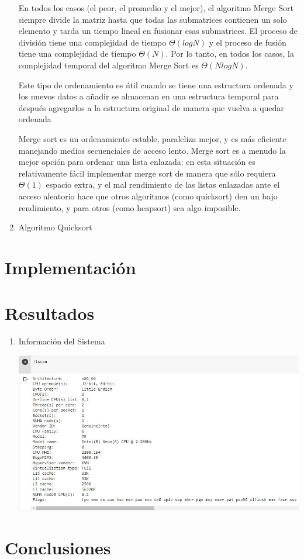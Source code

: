 \documentclass{article}
\begin{document}
\begin{enumerate}
        En todos los casos (el peor, el promedio y el mejor), el algoritmo Merge Sort siempre divide la matriz hasta que todas las submatrices contienen un solo elemento y tarda un tiempo lineal en fusionar esas submatrices. El proceso de división tiene una complejidad de tiempo $\Theta (logN)$ y el proceso de fusión tiene una complejidad de tiempo $\Theta (N)$. Por lo tanto, en todos los casos, la complejidad temporal del algoritmo Merge Sort es $\Theta(NlogN)$.

        Este tipo de ordenamiento es útil cuando se tiene una estructura ordenada y los nuevos datos a añadir se almacenan en una estructura temporal para después agregarlos a la estructura original de manera que vuelva a quedar ordenada
        
Merge sort es un ordenamiento estable, paraleliza mejor, y es más eficiente manejando medios secuenciales de acceso lento. Merge sort es a menudo la mejor opción para ordenar una lista enlazada: en esta situación es relativamente fácil implementar merge sort de manera que sólo requiera $\Theta (1)$ espacio extra, y el mal rendimiento de las listas enlazadas ante el acceso aleatorio hace que otros algoritmos (como quicksort) den un bajo rendimiento, y para otros (como heapsort) sea algo imposible.
	
		
	    \item Algoritmo Quicksort

		
	\end{enumerate}

\section{Implementación}

\section{Resultados}

    \begin{enumerate}
        \item Información del Sistema
        
        \includegraphics[width=\textwidth]{img/Captura1}
        
    \end{enumerate}

\section{Conclusiones}
	
		
	
\end{document}
